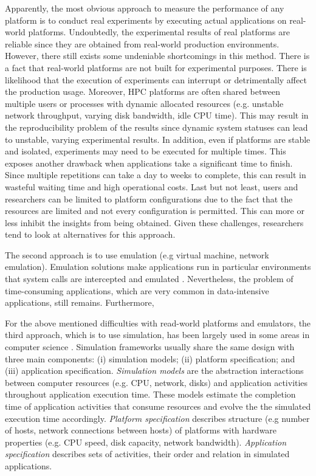 Apparently, the most obvious approach to measure the performance 
of any platform is to conduct real experiments by executing actual 
applications on real-world platforms. 
Undoubtedly, the experimental results of real platforms are reliable 
since they are obtained from real-world production environments. 
However, there still exists some undeniable shortcomings in this method. 
There is a fact that real-world platforms are not built for 
experimental purposes. 
There is likelihood that the execution of experiments can interrupt 
or detrimentally affect the production usage. 
Moreover, HPC platforms are often shared between multiple users or processes 
with dynamic allocated resources (e.g. unstable network throughput,  
varying disk bandwidth, idle CPU time). 
This may result in the reproducibility problem of the results since 
dynamic system statuses can lead to unstable, varying experimental results. 
In addition, even if platforms are stable and isolated, experiments may need 
to be executed for multiple times. 
This exposes another drawback when applications take a significant time 
to finish. Since multiple repetitions can take a day to weeks to complete, 
this can result in wasteful waiting time and high operational costs.  
Last but not least, users and researchers can be limited to platform 
configurations due to the fact that the resources are limited and 
not every configuration is permitted. This can more or less 
inhibit the insights from being obtained. 
Given these challenges, researchers tend to look at alternatives 
for this approach. 

The second approach is to use emulation (e.g virtual machine, 
network emulation). Emulation solutions make applications run 
in particular environments that system calls are intercepted 
and emulated \cite{casanova2008simgrid}. 
Nevertheless, the problem of time-consuming applications, 
which are very common in data-intensive applications, still remains. 
Furthermore, 

For the above mentioned difficulties with read-world platforms 
and emulators, the third approach, which is to use simulation, has been  
largely used in some areas in computer science \cite{casanova2008simgrid}.  
Simulation frameworks usually share the same design with three main 
components: (i) simulation models; (ii) platform specification; 
and (iii) application specification.
\textit{Simulation models} are the abstraction interactions between computer 
resources (e.g. CPU, network, disks) and application activities throughout 
application execution time. 
These models estimate the completion time of application activities 
that consume resources and evolve the the simulated execution time accordingly.
\textit{Platform specification} describes structure (e.g number of hosts, network
connections between hosts) of platforms with hardware properties 
(e.g. CPU speed, disk capacity, network bandwidth).
\textit{Application specification} describes sets of activities, their order 
and relation in simulated applications.

